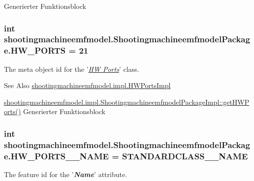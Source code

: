 Generierter Funktionsblock  \hypertarget{interfaceshootingmachineemfmodel_1_1_shootingmachineemfmodel_package_afa74b06d8a28f085369fdcb2b19b7b36}{
\subsubsection[{H\-W\-\_\-\-P\-O\-R\-T\-S}]{\setlength{\rightskip}{0pt plus 5cm}int shootingmachineemfmodel.\-Shootingmachineemfmodel\-Package.\-H\-W\-\_\-\-P\-O\-R\-T\-S = 21}}\label{interfaceshootingmachineemfmodel_1_1_shootingmachineemfmodel_package_afa74b06d8a28f085369fdcb2b19b7b36}
The meta object id for the '\hyperlink{classshootingmachineemfmodel_1_1impl_1_1_h_w_ports_impl}{{\itshape H\-W Ports}}' class.

\begin{DoxySeeAlso}{See Also}
\hyperlink{classshootingmachineemfmodel_1_1impl_1_1_h_w_ports_impl}{shootingmachineemfmodel.\-impl.\-H\-W\-Ports\-Impl} 

\hyperlink{classshootingmachineemfmodel_1_1impl_1_1_shootingmachineemfmodel_package_impl_a0e445554ec7e12a0acab69b315098594}{shootingmachineemfmodel.\-impl.\-Shootingmachineemfmodel\-Package\-Impl\-::get\-H\-W\-Ports()} Generierter Funktionsblock 
\end{DoxySeeAlso}
\hypertarget{interfaceshootingmachineemfmodel_1_1_shootingmachineemfmodel_package_a8c7830b95625a0ce6a38f99f0bbb4a6f}{
\subsubsection[{H\-W\-\_\-\-P\-O\-R\-T\-S\-\_\-\-\_\-\-N\-A\-M\-E}]{\setlength{\rightskip}{0pt plus 5cm}int shootingmachineemfmodel.\-Shootingmachineemfmodel\-Package.\-H\-W\-\_\-\-P\-O\-R\-T\-S\-\_\-\-\_\-\-N\-A\-M\-E = {\bf S\-T\-A\-N\-D\-A\-R\-D\-C\-L\-A\-S\-S\-\_\-\-\_\-\-N\-A\-M\-E}}}\label{interfaceshootingmachineemfmodel_1_1_shootingmachineemfmodel_package_a8c7830b95625a0ce6a38f99f0bbb4a6f}
The feature id for the '{\itshape {\bfseries Name}}' attribute.

